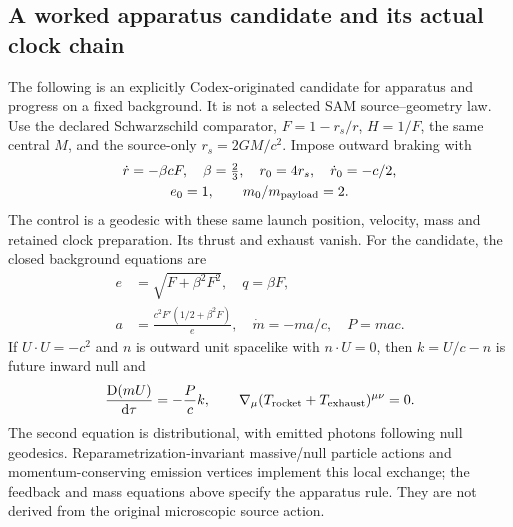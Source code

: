 \documentclass[10pt,twocolumn,letterpaper]{article}
\newcommand{\dd}{\mathrm{d}}
\begin{document}
\subsection{A worked apparatus candidate and its actual clock chain}
The following is an explicitly Codex-originated candidate for apparatus
and progress on a fixed background. It is not a selected SAM
source--geometry law. Use the declared Schwarzschild comparator,
$F=1-r_s/r$, $H=1/F$, the same central $M$, and the source-only
$r_s=2GM/c^2$. Impose outward braking with
\begin{equation}
 \begin{gathered}
 \dot r=-\beta cF,\quad\beta=\tfrac23,\quad
 r_0=4r_s,\quad\dot r_0=-c/2,\\
 e_0=1,\qquad m_0/m_{\rm payload}=2 .
 \end{gathered}
\end{equation}
The control is a geodesic with these same launch position, velocity,
mass and retained clock preparation. Its thrust and exhaust vanish.
For the candidate, the closed background equations are
\begin{equation}
 \begin{split}
 e&=\sqrt{F+\beta^2F^2},\quad q=\beta F,\\
 a&=\frac{c^2F'(1/2+\beta^2F)}{e},\quad
 \dot m=-ma/c,\quad P=mac .
 \end{split}
\end{equation}
If $U\cdot U=-c^2$ and $n$ is outward unit spacelike with $n\cdot U=0$,
then $k=U/c-n$ is future inward null and
\begin{equation}
 \frac{\mathrm D(mU)}{\dd\tau}=-\frac Pc k,\qquad
 \nabla_\mu(T_{\rm rocket}+T_{\rm exhaust})^{\mu\nu}=0 .
\end{equation}
The second equation is distributional, with emitted photons following
null geodesics. Reparametrization-invariant massive/null particle
actions and momentum-conserving emission vertices implement this local
exchange; the feedback and mass equations above specify the apparatus
rule. They are not derived from the original microscopic source action.
\end{document}
